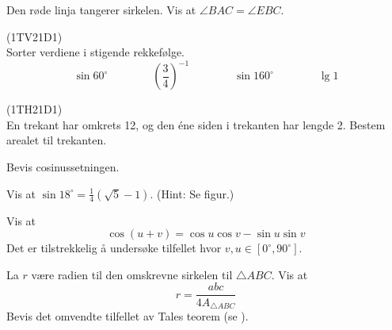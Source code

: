  \vs
{}

Den røde linja tangerer sirkelen. Vis at $ \angle BAC=\angle EBC $.
\newpage

(1TV21D1)\\
Sorter verdiene i stigende rekkefølge.
\[ \sin 60^\circ\qquad\qquad \left(\frac{3}{4}\right)^{-1}\qquad\qquad\sin 160^\circ\qquad\qquad \lg 1\]

(1TH21D1) \\
En trekant har omkrets 12, og den éne siden i trekanten har lengde 2. Bestem arealet til trekanten.

Bevis cosinussetningen.

Vis at $ \sin 18^\circ=\frac{1}{4}(\sqrt{5}-1) $. (Hint: Se figur.)

Vis at
\[ \cos(u+v)= \cos u\cos v-\sin u \sin v \]
Det er tilstrekkelig å undersøke tilfellet hvor $ v,u \in [0^\circ, 90^\circ] $.

\newpage
{}
La $ r $ være radien til den omskrevne sirkelen til $ \triangle ABC $. Vis at
\[ r=\frac{abc}{4A_{\triangle ABC}} \]
Bevis det omvendte tilfellet av Tales teorem (se  ).





